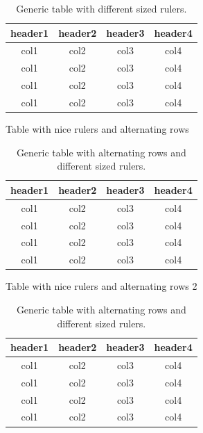 \begin{table}[h]
  \caption{Generic table with different sized rulers.}
  \footnotesize%
  \begin{center}
    \begin{tabular}{cccc}
      \toprule
      header1 & header2 & header3 & header4 \\
      \midrule
      col1 &  col2 & col3 & col4 \\
      col1 &  col2 & col3 & col4 \\
      col1 &  col2 & col3 & col4 \\
      col1 &  col2 & col3 & col4 \\
      \bottomrule
    \end{tabular}
  \end{center}
  \label{tab:tablerule}
\end{table}

Table with nice rulers and alternating rows

\begin{table}[h]
  \caption{Generic table with alternating rows and different sized rulers.}
  \footnotesize%
  \begin{center}
    \begin{tabular}{cccc}
      \toprule
      header1 & header2 & header3 & header4 \\
      \midrule
      col1 &  col2 & col3 & col4 \\
      col1 &  col2 & col3 & col4 \\
      col1 &  col2 & col3 & col4 \\
      col1 &  col2 & col3 & col4 \\
      \bottomrule
    \end{tabular}
  \end{center}
  \label{tab:tablerule2}
\end{table}

Table with nice rulers and alternating rows 2

\begin{table}[h]
  \caption{Generic table with alternating rows and different sized rulers.}
  \footnotesize%
  \begin{center}
    \begin{tabular}{cccc}
      \toprule
      header1 & header2 & header3 & header4 \\
      \midrule
      col1 &  col2 & col3 & col4 \\
      col1 &  col2 & col3 & col4 \\
      col1 &  col2 & col3 & col4 \\
      col1 &  col2 & col3 & col4 \\
      \bottomrule
    \end{tabular}
  \end{center}
  \label{tab:tablerule3}
\end{table}


